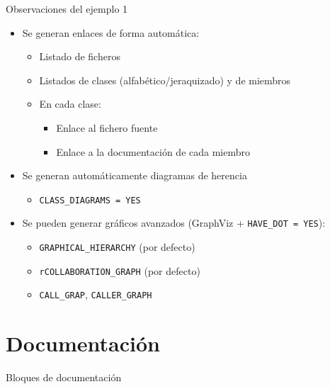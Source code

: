 \documentclass[12pt,xcolor=svgnames]{beamer}
\begin{document}
\begin{frame}{Observaciones del ejemplo 1}
  \begin{itemize}
  \item Se generan enlaces de forma automática:
    \begin{itemize}
    \item Listado de ficheros
    \item Listados de clases (alfabético/jeraquizado) y de miembros
    \item En cada clase: 
      \begin{itemize}
      \item Enlace al fichero fuente
      \item Enlace a la documentación de cada miembro
      \end{itemize}
    \end{itemize}
  \item Se generan automáticamente diagramas de herencia
    \begin{itemize}
    \item \texttt{CLASS\_DIAGRAMS = YES}
    \end{itemize}
  \item Se pueden generar gráficos avanzados (GraphViz + \texttt{HAVE\_DOT =
      YES}):
    \begin{itemize}
    \item \texttt{GRAPHICAL\_HIERARCHY} (por defecto)
    \item \texttt{rCOLLABORATION\_GRAPH} (por defecto)
    \item \texttt{CALL\_GRAP}, \texttt{CALLER\_GRAPH}
    \end{itemize}
  \end{itemize}
\end{frame}

\section{Documentación}

\begin{frame}[fragile]{Bloques de documentación}
  \inputminted[fontsize=\footnotesize]{c++}{../materiales/codigo/coment.cpp}
\end{frame}
\end{document}
